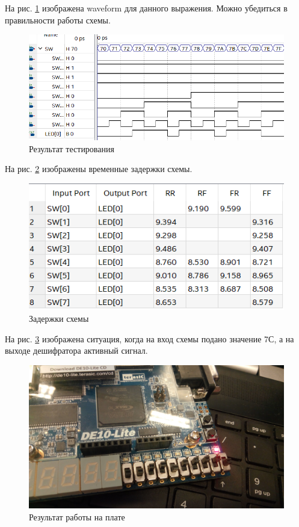 \documentclass[a4paper,14pt]{article}
\begin{document}
На рис. \ref{fig:wave} изображена waveform для данного выражения.
Можно убедиться в правильности работы схемы.

\begin{figure}[H]
	\centering
	\includegraphics[width=\linewidth]{image/wave}
	\caption{Результат тестирования}
	\label{fig:wave}
\end{figure}

На рис. \ref{fig:time} изображены временные задержки схемы.

\begin{figure}[H]
	\centering
	\includegraphics[width=\linewidth]{image/time}
	\caption{Задержки схемы}
	\label{fig:time}
\end{figure}

На рис. \ref{fig:demo} изображена ситуация, когда на вход схемы подано значение 7С, а на выходе дешифратора активный сигнал.

\begin{figure}[H]
	\centering
	\includegraphics[width=0.8\linewidth]{image/demo}
	\caption{Результат работы на плате}
	\label{fig:demo}
\end{figure}
\end{document}
